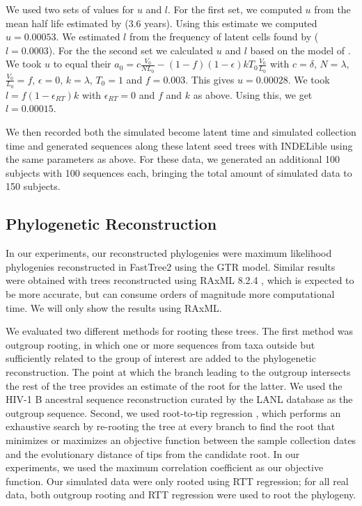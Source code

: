 \documentclass[12pt]{article}
\begin{document}
We used two sets of values for $u$ and $l$.
For the first set, we computed $u$ from the mean half life estimated by \cite{Crooks15} ($3.6$ years).
Using this estimate we computed $u = 0.00053$.
We estimated $l$ from the frequency of latent cells found by \cite{Ho13} ($l=0.0003$).
For the the second set we calculated $u$ and $l$ based on the model of \cite{Kim06}.
We took $u$ to equal their $a_0 = c\frac{V_0}{NL_0}-(1-f)(1-\epsilon)kT_0\frac{V_0}{L_0}$ with $c = \delta$, $N = \lambda$,  $\frac{V_0}{L_0} = f$, $\epsilon = 0$, $k = \lambda$, $T_0 = 1$ and $f = 0.003$.
This gives $u = 0.00028$.
We took $l = f(1-\epsilon_{RT})k$ with $\epsilon_{RT} = 0$ and $f$ and $k$ as above.
Using this, we get $l = 0.00015$.

We then recorded both the simulated become latent time and simulated collection time and generated sequences along these latent seed trees with INDELible using the same parameters as above. 
For these data, we generated an additional 100 subjects with 100 sequences each, bringing the total amount of simulated data to 150 subjects.

\subsection * {Phylogenetic Reconstruction} \label{subsec:phylo}
In our experiments, our reconstructed phylogenies were maximum likelihood phylogenies reconstructed in FastTree2 \citep{FastTree10} using the GTR model.
Similar results were obtained with trees reconstructed using RAxML 8.2.4 \citep{Raxml14}, which is expected to be more accurate, but can consume orders of magnitude more computational time.
We will only show the results using RAxML.

We evaluated two different methods for rooting these trees. 
The first method was outgroup rooting, in which one or more sequences from taxa outside but sufficiently related to the group of interest are added to the phylogenetic reconstruction.
The point at which the branch leading to the outgroup intersects the rest of the tree provides an estimate of the root for the latter.
We used the HIV-1 B ancestral sequence reconstruction curated by the LANL database \citep{LosAlamos} as the outgroup sequence.
Second, we used root-to-tip regression \citep[RTT;][]{Korber00}, which performs an exhaustive search by re-rooting the tree at every branch to find the root that minimizes or maximizes an objective function between the sample collection dates and the evolutionary distance of tips from the candidate root.
In our experiments, we used the maximum correlation coefficient as our objective function.
Our simulated data were only rooted using RTT regression; for all real data, both outgroup rooting and RTT regression were used to root the phylogeny.
\end{document}
